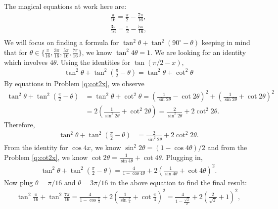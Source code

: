 \begin{solution}[name=Solution by Amir Parvardi]
The magical equations at work here are:
\begin{align*}
    \frac{\pi}{16} =  \frac{\pi}{2} - \frac{7\pi}{16},\\
    \frac{3\pi}{16} =  \frac{\pi}{2} - \frac{5\pi}{16},\\
\end{align*}
We will focus on finding a formula for $\tan^2 \theta + \tan^2 (90^\circ - \theta)$ keeping in mind that for $\theta \in \{\frac{\pi}{16}, \frac{3\pi}{16}, \frac{5\pi}{16}, \frac{7\pi}{16}\}$, we know $\tan^2 4\theta = 1$. We are looking for an identity which involves $4 \theta$. Using the identities for $\tan(\pi/2-x)$, 
    \begin{align*}
        \tan^2 \theta + \tan^2 \left(\frac{\pi}{2} - \theta\right) = \tan^2 \theta + \cot^2 \theta
    \end{align*}
By equations in Problem \ref{q:cot2x}, we observe
    \begin{align*}
        \tan^2 \theta + \tan^2 \left(\frac{\pi}{2} - \theta\right) &= \tan^2 \theta + \cot^2 \theta = \left(\frac{1}{\sin 2\theta} - \cot 2\theta \right)^2 + \left(\frac{1}{\sin 2\theta} + \cot 2\theta \right)^2\\
        &= 2 \left( \frac{1}{\sin^2 2\theta} + \cot^2 2 \theta\right) = \frac{2}{\sin^2 2\theta} + 2 \cot^2 2\theta.
    \end{align*}
Therefore,
    \begin{align*}
        \tan^2 \theta + \tan^2 \left(\frac{\pi}{2} - \theta\right) &= \frac{2}{\sin^2 2\theta} + 2 \cot^2 2\theta.
    \end{align*}
    From the identity for $\cos4x$, we know $\sin^2 2\theta = (1 - \cos 4 \theta)/2$ and from the Problem \ref{q:cot2x}, we know $ \cot 2\theta = \frac{1}{\sin 4\theta} + \cot 4\theta$. Plugging in,
    \begin{align*}
        \tan^2 \theta + \tan^2 \left(\frac{\pi}{2} - \theta\right) = \frac{4}{1 - \cos 4\theta} + 2 \left(\frac{1}{\sin 4\theta} + \cot 4\theta\right)^2.
    \end{align*}
Now plug $\theta = \pi/16$ and $\theta = 3\pi/16$ in the above equation to find the final result:
    \begin{align*}
        \tan^2 \frac{\pi}{16} + \tan^2 \frac{7\pi}{16} = \frac{4}{1 - \cos \frac{\pi}{4}} + 2 \left(\frac{1}{\sin \frac{\pi}{4}} + \cot \frac{\pi}{4}\right)^2 = \frac{4}{1 - \frac{\sqrt 2}{2}} + 2 \left(\frac{2}{\sqrt 2} + 1\right)^2,\\

\end{align*}
\end{solution}
